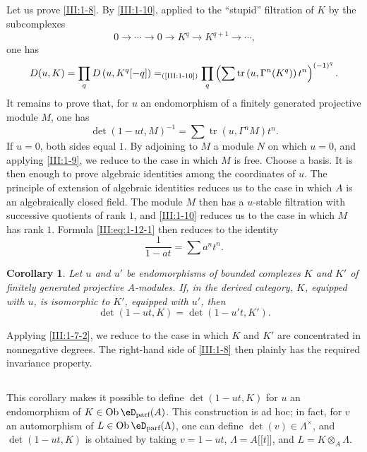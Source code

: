 \documentclass[12pt,oneside,english]{smfbook}
\DeclareMathOperator{\ob}{Ob}
\DeclareMathOperator{\tr}{tr}
\providecommand{\llbracket}{\mathopen{[\![}}
\providecommand{\rrbracket}{\mathclose{]\!]}}
\newtheorem{corollary_}[subsection]{Corollary}
\begin{document}
\subsection{}\label{III:1-12}

Let us prove \ref{III:1-8}. By \ref{III:1-10}, applied to the ``stupid'' filtration of $K$ by the subcomplexes
\[
  0 \to \cdots \to 0 \to K^q \to K^{q+1} \to \cdots \text{,}
\]
one has
\[
  D(u,K) = \prod_q D\left(u,K^q[-q]\right) =_{\text{(\ref{III:1-10})}} \prod_q \left(\sum \tr\left(u,\Gamma^n(K^q)\right) t^n \right)^{(-1)^q} \text{.}
\]
It remains to prove that, for $u$ an endomorphism of a finitely generated projective module $M$, one has
\begin{equation*}\tag{1.12.1}\label{III:eq:1-12-1}
  \det\left(1-u t,M\right)^{-1} = \sum \tr(u,\Gamma^n M) t^n \text{.}
\end{equation*}
If $u=0$, both sides equal $1$. By adjoining to $M$ a module $N$ on which $u=0$, and applying \ref{III:1-9}, we reduce to the case in which $M$ is free. Choose a basis. It is then enough to prove algebraic identities among the coordinates of $u$. The principle of extension of algebraic identities reduces us to the case in which $A$ is an algebraically closed field. The module $M$ then has a $u$-stable filtration with successive quotients of rank $1$, and \ref{III:1-10} reduces us to the case in which $M$ has rank $1$. Formula \eqref{III:eq:1-12-1} then reduces to the identity
\[
  \frac{1}{1-a t} = \sum a^n t^n \text{.}
\]

\begin{corollary_}\label{III:1-13}
Let $u$ and $u'$ be endomorphisms of bounded complexes $K$ and $K'$ of finitely generated projective $A$-modules. If, in the derived category, $K$, equipped with $u$, is isomorphic to $K'$, equipped with $u'$, then
\[
  \det(1-u t,K) = \det(1-u' t,K') \text{.}
\]
\end{corollary_}

Applying \ref{III:1-7-2}, we reduce to the case in which $K$ and $K'$ are concentrated in nonnegative degrees. The right-hand side of \ref{III:1-8} then plainly has the required invariance property.

\subsection{}\label{III:1-14}

This corollary makes it possible to define $\det(1-ut,K)$ for $u$ an endomorphism of $K\in\ob\eD_\text{parf}(A)$. This construction is ad hoc; in fact, for $v$ an automorphism of $L\in\ob\eD_\text{parf}(\Lambda)$, one can define $\det(v)\in\Lambda^\times$, and $\det(1-ut,K)$ is obtained by taking $v=1-ut$, $\Lambda=A\llbracket t\rrbracket$, and $L=K\otimes_A\Lambda$.
\end{document}
